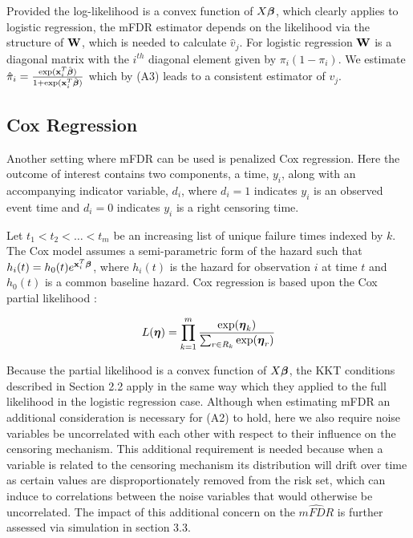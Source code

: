
Provided the log-likelihood is a convex function of $X\boldsymbol{\beta}$, which clearly applies to logistic regression, the mFDR estimator depends on the likelihood via the structure of $\mathbf{W}$, which is needed to calculate $\hat{v}_j$. For logistic regression $\mathbf{W}$ is a diagonal matrix with the $i^{th}$ diagonal element given by $\pi_i(1 - \pi_i)$. We estimate $\hat{\pi}_i = \frac{\exp(\mathbf{x}_i^T\hat{\boldsymbol{\beta}})} {1 +\exp(\mathbf{x}_i^T\hat{\boldsymbol{\beta}})}$ which by (A3) leads to a consistent estimator of $v_j$.

\subsection{Cox Regression}

Another setting where mFDR can be used is penalized Cox regression. Here the outcome of interest contains two components, a time, $y_i$, along with an accompanying indicator variable, $d_i$, where $d_i = 1$ indicates $y_i$ is an observed event time and $d_i = 0$ indicates $y_i$ is a right censoring time.  

Let $t_1 < t_2 < \ldots < t_m$ be an increasing list of unique failure times indexed by $k$. The Cox model assumes a semi-parametric form of the hazard such that $h_i(t) = h_0(t)e^{\mathbf{x}_i^T \boldsymbol{\beta}}$, where $h_i(t)$ is the hazard for observation $i$ at time $t$ and $h_0(t)$ is a common baseline hazard. Cox regression is based upon the Cox partial likelihood \citep{Cox1972}:

\begin{equation*}
L(\boldsymbol{\eta})  = \prod_{k=1}^{m} \frac{\exp(\boldsymbol{\eta}_k)}{\sum_{r \in R_k} \exp(\boldsymbol{\eta}_r) } 
\end{equation*}

Because the partial likelihood is a convex function of $X\boldsymbol{\beta}$, the KKT conditions described in Section 2.2 apply in the same way which they applied to the full likelihood in the logistic regression case. Although when estimating mFDR an additional consideration is necessary for (A2) to hold, here we also require noise variables be uncorrelated with each other with respect to their influence on the censoring mechanism. This additional requirement is needed because when a variable is related to the censoring mechanism its distribution will drift over time as certain values are disproportionately removed from the risk set, which can induce to correlations between the noise variables that would otherwise be uncorrelated. The impact of this additional concern on the $\widehat{mFDR}$ is further assessed via simulation in section 3.3. 

